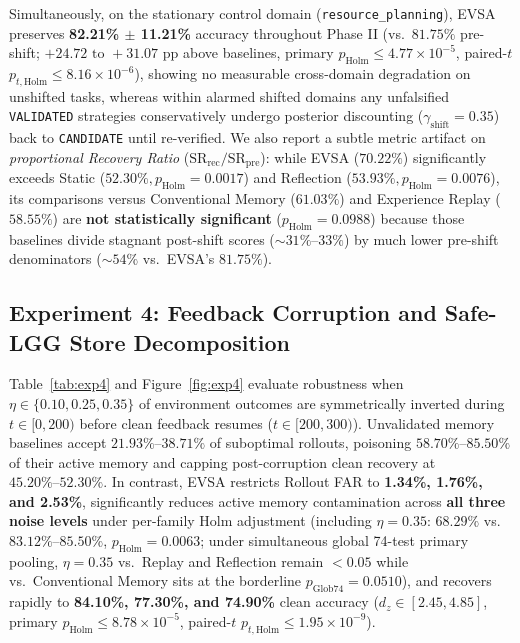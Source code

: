 \documentclass[10pt,letterpaper]{article}
\begin{document}
Simultaneously, on the stationary control domain (\texttt{resource\_planning}), EVSA preserves \textbf{82.21\% $\pm$ 11.21\%} accuracy throughout Phase II (vs.\ $81.75\%$ pre-shift; $+24.72\text{ to }+31.07\text{ pp}$ above baselines, primary $p_{\mathrm{Holm}} \le 4.77 \times 10^{-5}$, paired-$t$ $p_{t,\mathrm{Holm}} \le 8.16 \times 10^{-6}$), showing no measurable cross-domain degradation on unshifted tasks, whereas within alarmed shifted domains any unfalsified \texttt{VALIDATED} strategies conservatively undergo posterior discounting ($\gamma_{\mathrm{shift}} = 0.35$) back to \texttt{CANDIDATE} until re-verified. We also report a subtle metric artifact on \emph{proportional Recovery Ratio} ($\mathrm{SR}_{\mathrm{rec}} / \mathrm{SR}_{\mathrm{pre}}$): while EVSA ($70.22\%$) significantly exceeds Static ($52.30\%, p_{\mathrm{Holm}}=0.0017$) and Reflection ($53.93\%, p_{\mathrm{Holm}}=0.0076$), its comparisons versus Conventional Memory ($61.03\%$) and Experience Replay ($58.55\%$) are \textbf{not statistically significant} ($p_{\mathrm{Holm}} = 0.0988$) because those baselines divide stagnant post-shift scores ($\sim 31\%\text{--}33\%$) by much lower pre-shift denominators ($\sim 54\%$ vs.\ EVSA's $81.75\%$).

\subsection{Experiment 4: Feedback Corruption and Safe-LGG Store Decomposition}
Table~\ref{tab:exp4} and Figure~\ref{fig:exp4} evaluate robustness when $\eta \in \{0.10, 0.25, 0.35\}$ of environment outcomes are symmetrically inverted during $t \in [0, 200)$ before clean feedback resumes ($t \in [200, 300)$). Unvalidated memory baselines accept $21.93\%\text{--}38.71\%$ of suboptimal rollouts, poisoning $58.70\%\text{--}85.50\%$ of their active memory and capping post-corruption clean recovery at $45.20\%\text{--}52.30\%$. In contrast, EVSA restricts Rollout FAR to \textbf{1.34\%, 1.76\%, and 2.53\%}, significantly reduces active memory contamination across \textbf{all three noise levels} under per-family Holm adjustment (including $\eta=0.35$: $68.29\%$ vs.\ $83.12\%\text{--}85.50\%$, $p_{\mathrm{Holm}} = 0.0063$; under simultaneous global 74-test primary pooling, $\eta=0.35$ vs.\ Replay and Reflection remain $<0.05$ while vs.\ Conventional Memory sits at the borderline $p_{\mathrm{Glob74}} = 0.0510$), and recovers rapidly to \textbf{84.10\%, 77.30\%, and 74.90\%} clean accuracy ($d_z \in [2.45, 4.85]$, primary $p_{\mathrm{Holm}} \le 8.78 \times 10^{-5}$, paired-$t$ $p_{t,\mathrm{Holm}} \le 1.95 \times 10^{-9}$).
\end{document}
